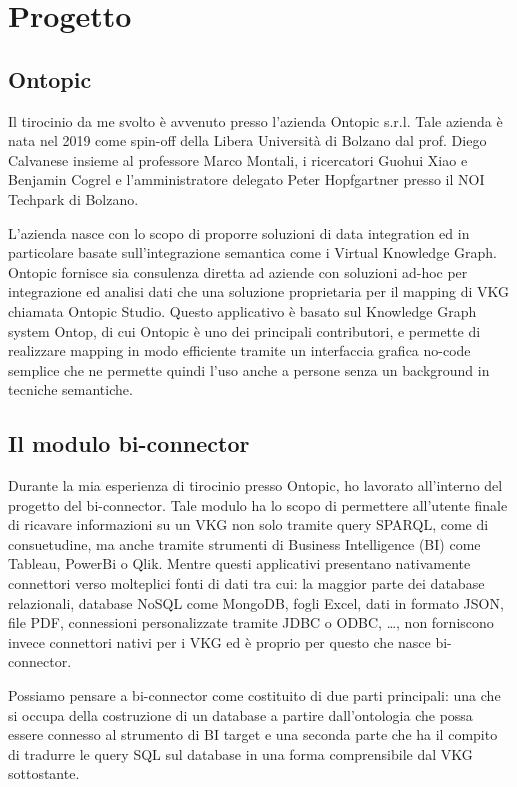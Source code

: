 \chapter{Progetto}
\label{cha:experience}

\section{Ontopic}
\label{sec:ontopic}
Il tirocinio da me svolto è avvenuto presso l'azienda Ontopic s.r.l. Tale azienda è nata nel 2019 come spin-off della Libera Università di Bolzano dal prof. Diego Calvanese insieme al professore Marco Montali, i ricercatori Guohui Xiao e Benjamin Cogrel 
e l’amministratore delegato Peter Hopfgartner presso il NOI Techpark di Bolzano\cite{Ontopic}.

L'azienda nasce con lo scopo di proporre soluzioni di data integration ed in particolare basate sull'integrazione semantica come i Virtual Knowledge Graph. Ontopic fornisce sia consulenza diretta ad aziende con soluzioni ad-hoc
per integrazione ed analisi dati che una soluzione proprietaria per il mapping di VKG chiamata Ontopic Studio. Questo applicativo è basato sul Knowledge Graph system Ontop, di cui Ontopic è uno dei principali contributori, e permette di realizzare mapping 
in modo efficiente tramite un interfaccia grafica no-code semplice che ne permette quindi l'uso anche a persone senza un background in tecniche semantiche. \cite{OntopicStudio}    

\section{Il modulo bi-connector}
\label{sec:bi-connector}
Durante la mia esperienza di tirocinio presso Ontopic, ho lavorato all'interno del progetto del bi-connector. Tale modulo ha lo scopo di permettere all'utente finale di ricavare informazioni su un VKG non solo tramite query SPARQL, come di consuetudine, ma anche
tramite strumenti di Business Intelligence (BI) come Tableau, PowerBi o Qlik. 
Mentre questi applicativi presentano nativamente connettori verso molteplici fonti di dati tra cui: la maggior parte dei database relazionali, database NoSQL come MongoDB, fogli Excel, 
dati in formato JSON, file PDF, connessioni personalizzate tramite JDBC o ODBC, \dots, non forniscono invece connettori nativi per i VKG ed è proprio per questo che nasce bi-connector.

\begin{comment}{}
    In particolare, il primo applicativo di business intelligence su quale si è focalizzato lo sforzo di sviluppo è stato Tableau e perciò nel resto dell'elaborato farò principalmente riferimento a questo.
\end{comment}
Possiamo pensare a bi-connector come costituito di due parti principali: una che si occupa della costruzione di un database a partire dall'ontologia che possa essere connesso al strumento di BI target e una seconda parte che ha il compito di tradurre le query 
SQL sul database in una forma comprensibile dal VKG sottostante.

